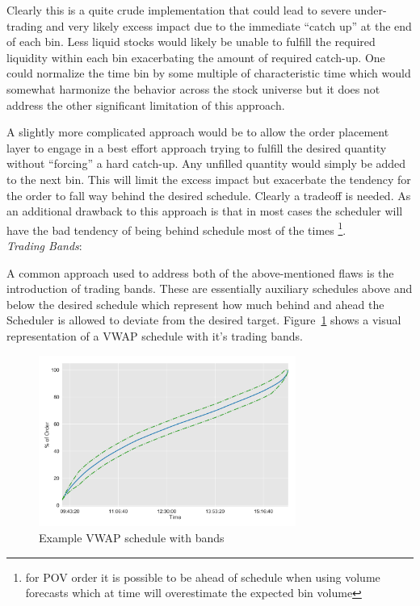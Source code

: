 Clearly  this is a quite crude implementation that could lead to severe under-trading and very likely excess impact due to the immediate ``catch up'' at the end of each bin. Less liquid stocks would likely be unable to fulfill the required liquidity within each bin exacerbating the amount of required catch-up. One could normalize the time bin by some multiple of characteristic time which would somewhat harmonize the behavior across the stock universe but it does not address the other significant limitation of this approach.

A slightly more complicated approach would be to allow the order placement layer to engage in a best effort approach trying to fulfill the desired quantity without ``forcing'' a hard catch-up. Any unfilled quantity would simply be added to the next bin. This will limit the excess impact but exacerbate the tendency for the order to fall way behind the desired schedule. Clearly a tradeoff is needed. As an additional drawback to this approach is that in most cases the scheduler will have the bad tendency of being behind schedule most of the times \footnote{for POV order it is possible to be ahead of schedule when using volume forecasts which at time will overestimate the expected bin volume}.\\

\noindent\emph{Trading Bands}: 

A common approach used to address both of the above-mentioned flaws is the introduction of trading bands. These are essentially auxiliary schedules above and below the desired schedule which represent how much behind and ahead the Scheduler is allowed to deviate from the desired target. Figure~\ref{fig:schedule} shows a visual representation of a VWAP schedule with it's trading bands. 

\begin{figure}[!ht]
	\centering
	\includegraphics[width=0.75\textwidth]{chapters/chapter_exec_models/figures/schedule.png} 
	\caption{Example VWAP schedule with bands \label{fig:schedule}}
	\end{figure}

